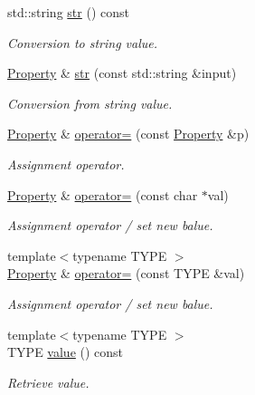 \begin{DoxyCompactItemize}
std::string \hyperlink{class_d_d4hep_1_1_property_aed04b1176882fe335eb03a2044bc1cf2}{str} () const 
\begin{DoxyCompactList}\small\item\em Conversion to string value. \item\end{DoxyCompactList}\item 
\hyperlink{class_d_d4hep_1_1_property}{Property} \& \hyperlink{class_d_d4hep_1_1_property_a4f4d25269959d15fb6b6c9cf581ee2a4}{str} (const std::string \&input)
\begin{DoxyCompactList}\small\item\em Conversion from string value. \item\end{DoxyCompactList}\item 
\hyperlink{class_d_d4hep_1_1_property}{Property} \& \hyperlink{class_d_d4hep_1_1_property_a18c732c983b1ae9f1c1cc801e6e17706}{operator=} (const \hyperlink{class_d_d4hep_1_1_property}{Property} \&p)
\begin{DoxyCompactList}\small\item\em Assignment operator. \item\end{DoxyCompactList}\item 
\hyperlink{class_d_d4hep_1_1_property}{Property} \& \hyperlink{class_d_d4hep_1_1_property_a5b6de39455110bc81a239a92115d816e}{operator=} (const char $\ast$val)
\begin{DoxyCompactList}\small\item\em Assignment operator / set new balue. \item\end{DoxyCompactList}\item 
{\footnotesize template$<$typename TYPE $>$ }\\\hyperlink{class_d_d4hep_1_1_property}{Property} \& \hyperlink{class_d_d4hep_1_1_property_ac47fe600ca62fcd0cfc22ae927d9271c}{operator=} (const TYPE \&val)
\begin{DoxyCompactList}\small\item\em Assignment operator / set new balue. \item\end{DoxyCompactList}\item 
{\footnotesize template$<$typename TYPE $>$ }\\TYPE \hyperlink{class_d_d4hep_1_1_property_a8aa2bfdecfc6cdb06c4f8c1cf7a01600}{value} () const 
\begin{DoxyCompactList}\small\item\em Retrieve value. \item\end{DoxyCompactList}\item 

\end{DoxyCompactItemize}
